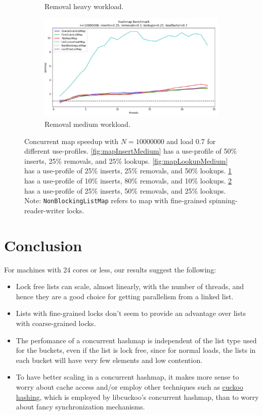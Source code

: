 \documentclass[11pt]{article}
\begin{document}
\begin{figure}[h]
\begin{subfigure}{0.5\textwidth}
  \caption{Removal heavy workload.}
  \label{fig:mapRemovalHeavy}
\end{subfigure}%
\hspace*{\fill}
\begin{subfigure}{.5\textwidth}
  \centering
  \includegraphics[width=1.0\linewidth]{figs/patricio/latedays/removals_medium.jpg}
  \caption{Removal medium workload.}
  \label{fig:mapRemoveMedium}
\end{subfigure}
\caption{
Concurrent map speedup with $N=10000000$ and load 0.7 for different use-profiles.
\ref{fig:mapInsertMedium} has a use-profile of 50\% inserts, 25\% removals, and
25\% lookups. \ref{fig:mapLookupMedium} has a use-profile of 25\% inserts, 25\%
removals, and 50\% lookups. \ref{fig:mapRemovalHeavy} has a use-profile of 10\%
inserts, 80\% removals, and 10\% lookups. \ref{fig:mapRemoveMedium} has a
use-profile of 25\% inserts, 50\% removals, and 25\% lookups. Note:
{\tt NonBlockingListMap} refers to map with fine-grained spinning-reader-writer locks.
}
\label{fig:restofMaps}
\end{figure}


\section{Conclusion}
For machines with 24 cores or less, our results suggest the following:
\begin{itemize}
\item
Lock free lists can scale, almost linearly, with the number of threads, and
hence they are a good choice for getting parallelism from a linked list.
\item
Lists with fine-grained locks don't seem to provide an advantage over lists with
coarse-grained locks.
\item
The perfomance of a concurrent hashmap is independent of the list type used
for the buckets, even if the list is lock free, since for normal loads, the lists
in each bucket will have very few elements and low contention.
\item
To have better scaling in a concurrent hashmap, it makes more sense to worry about
cache access and/or employ other techniques such as
\href{https://en.wikipedia.org/wiki/Cuckoo_hashing}{cuckoo hashing}, which is
employed by libcuckoo's concurrent hashmap, than to worry about fancy synchronization
mechanisms.
\end{itemize}
\end{document}
